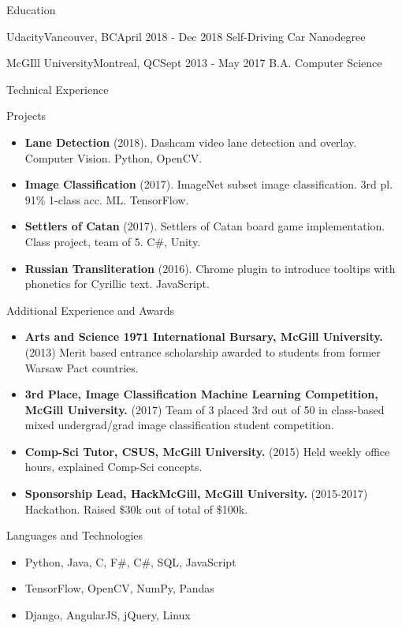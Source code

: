 \documentclass[]{muchicv}
\begin{document}
	\begin{cvsection}{Education}
		\begin{cvsubsection}{Udacity}{Vancouver, BC}{April 2018 - Dec 2018}
			Self-Driving Car Nanodegree
		\end{cvsubsection}
		\begin{cvsubsection}{McGIll University}{Montreal, QC}{Sept 2013 - May 2017}
			B.A. Computer Science
		\end{cvsubsection}
	\end{cvsection}
	
	\begin{cvsection}{Technical Experience}
		\begin{cvsubsection}{Projects}{}{}
			\begin{itemize}
				\item \textbf{Lane Detection} (2018). Dashcam video lane detection and overlay. Computer Vision. Python, OpenCV.
				\item \textbf{Image Classification} (2017). ImageNet subset image classification. 3rd pl. 91\% 1-class acc. ML. TensorFlow.
				\item \textbf{Settlers of Catan} (2017).  Settlers of Catan board game implementation. Class project, team of 5. C\#, Unity.
				\item \textbf{Russian Transliteration} (2016). Chrome plugin to introduce tooltips with phonetics for Cyrillic text. JavaScript.
			\end{itemize}
		\end{cvsubsection}
	\end{cvsection}
	
	\begin{cvsection}{Additional Experience and Awards}
		\begin{cvsubsection}{}{}{}	
			\begin{itemize}
				\item \textbf{Arts and Science 1971 International Bursary, McGill University.} (2013) Merit based entrance scholarship awarded to students from former Warsaw Pact countries.
				\item \textbf{3rd Place, Image Classification Machine Learning Competition, McGill University.} (2017) Team of 3 placed 3rd out of 50 in class-based mixed undergrad/grad image classification student competition.
				\item \textbf{Comp-Sci Tutor, CSUS, McGill University.} (2015) Held weekly office hours, explained Comp-Sci concepts.
				\item \textbf{Sponsorship Lead, HackMcGill, McGill University.} (2015-2017) Hackathon. Raised \$30k out of total of \$100k.
			\end{itemize}
		\end{cvsubsection}
	\end{cvsection}
	
	\begin{cvsection}{Languages and Technologies}
		\begin{cvsubsection}{}{}{}	
			\begin{itemize}
				\item Python, Java, C, F\#, C\#, SQL, JavaScript 
				\item TensorFlow, OpenCV, NumPy, Pandas
				\item Django, AngularJS, jQuery, Linux
			\end{itemize}
		\end{cvsubsection}
	\end{cvsection}
	
\end{document}
